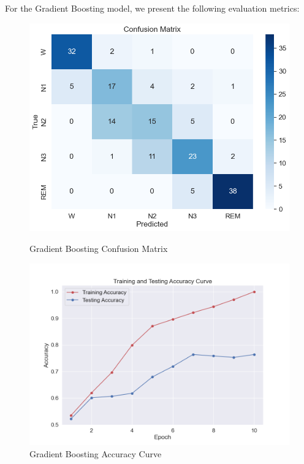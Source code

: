 For the Gradient Boosting model, we present the following evaluation metrics:

\begin{figure}[H]
	\centering
	\begin{minipage}[b]{0.45\textwidth}
		\centering
		\includegraphics[width=\textwidth]{img/paper_1//confusion_matrix.png}
		\caption{Gradient Boosting Confusion Matrix}
	\end{minipage}
	\hfill
	\begin{minipage}[b]{0.45\textwidth}
		\centering
		\includegraphics[width=\textwidth]{img/paper_1//accuracy_curve.png}
		\caption{Gradient Boosting Accuracy Curve}
	\end{minipage}
	

\end{figure}
